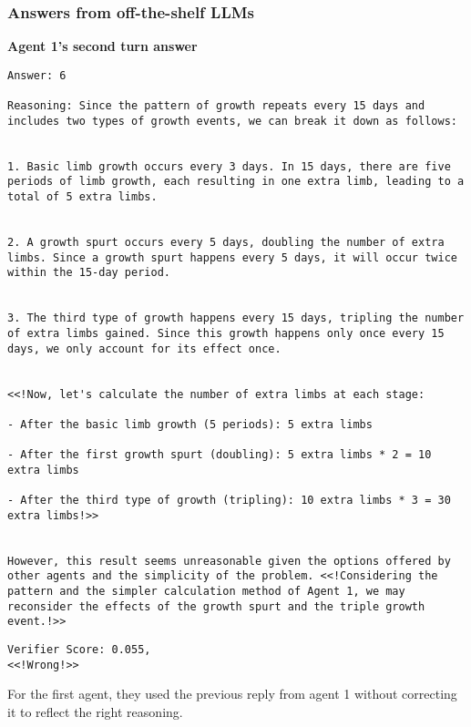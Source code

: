 \subsubsection{Answers from off-the-shelf LLMs}
\textbf{Agent 1's second turn answer} 
\begin{lstlisting}
Answer: 6

Reasoning: Since the pattern of growth repeats every 15 days and includes two types of growth events, we can break it down as follows:


1. Basic limb growth occurs every 3 days. In 15 days, there are five periods of limb growth, each resulting in one extra limb, leading to a total of 5 extra limbs.


2. A growth spurt occurs every 5 days, doubling the number of extra limbs. Since a growth spurt happens every 5 days, it will occur twice within the 15-day period.


3. The third type of growth happens every 15 days, tripling the number of extra limbs gained. Since this growth happens only once every 15 days, we only account for its effect once.


<<!Now, let's calculate the number of extra limbs at each stage:

- After the basic limb growth (5 periods): 5 extra limbs

- After the first growth spurt (doubling): 5 extra limbs * 2 = 10 extra limbs

- After the third type of growth (tripling): 10 extra limbs * 3 = 30 extra limbs!>>


However, this result seems unreasonable given the options offered by other agents and the simplicity of the problem. <<!Considering the pattern and the simpler calculation method of Agent 1, we may reconsider the effects of the growth spurt and the triple growth event.!>>
\end{lstlisting}
\begin{lstlisting}
Verifier Score: 0.055,
<<!Wrong!>> 
\end{lstlisting}
For the first agent, they used the previous reply from agent 1 without correcting it to reflect the right reasoning.

